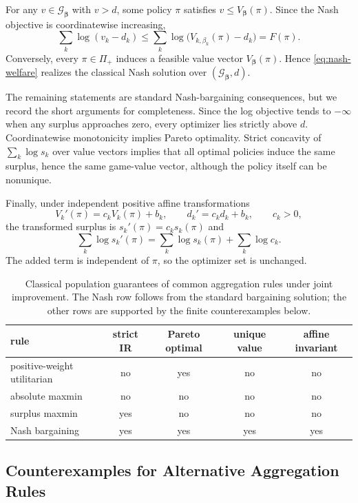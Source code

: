 \documentclass{article}
\theoremstyle{remark}
\theoremstyle{plain}
\newcommand{\G}{\mathcal{G}}
\begin{document}
For any $v\in\G_{\boldsymbol\beta}$ with $v>d$, some policy $\pi$ satisfies $v\le V_{\boldsymbol\beta}(\pi)$. Since the Nash objective is coordinatewise increasing,
\[
\sum_k\log(v_k-d_k)
\le
\sum_k\log\bigl(V_{k,\beta_k}(\pi)-d_k\bigr)
=F(\pi).
\]
Conversely, every $\pi\in\Pi_+$ induces a feasible value vector $V_{\boldsymbol\beta}(\pi)$. Hence \eqref{eq:nash-welfare} realizes the classical Nash solution over $(\G_{\boldsymbol\beta},d)$.

The remaining statements are standard Nash-bargaining consequences, but we record the short arguments for completeness. Since the log objective tends to $-\infty$ when any surplus approaches zero, every optimizer lies strictly above $d$. Coordinatewise monotonicity implies Pareto optimality. Strict concavity of $\sum_k\log s_k$ over value vectors implies that all optimal policies induce the same surplus, hence the same game-value vector, although the policy itself can be nonunique.

Finally, under independent positive affine transformations
\[
V_k'(\pi)=c_kV_k(\pi)+b_k,
\qquad
d_k'=c_kd_k+b_k,
\qquad c_k>0,
\]
the transformed surplus is $s_k'(\pi)=c_ks_k(\pi)$ and
\[
\sum_k\log s_k'(\pi)
=
\sum_k\log s_k(\pi)+\sum_k\log c_k.
\]
The added term is independent of $\pi$, so the optimizer set is unchanged.

\begin{table}[htbp]
\centering\footnotesize
\setlength{\tabcolsep}{4.2pt}
\caption{Classical population guarantees of common aggregation rules under joint improvement. The Nash row follows from the standard bargaining solution; the other rows are supported by the finite counterexamples below.}
\label{tab:rule-guarantees}
\begin{tabular}{lcccc}
\toprule
rule & strict IR & Pareto optimal & unique value & affine invariant\\
\midrule
positive-weight utilitarian & no & yes & no & no\\
absolute maxmin & no & no & no & no\\
surplus maxmin & yes & no & no & no\\
Nash bargaining & yes & yes & yes & yes\\
\bottomrule
\end{tabular}
\end{table}

\subsection{Counterexamples for Alternative Aggregation Rules}
\label{app:rule-witnesses}
\end{document}
